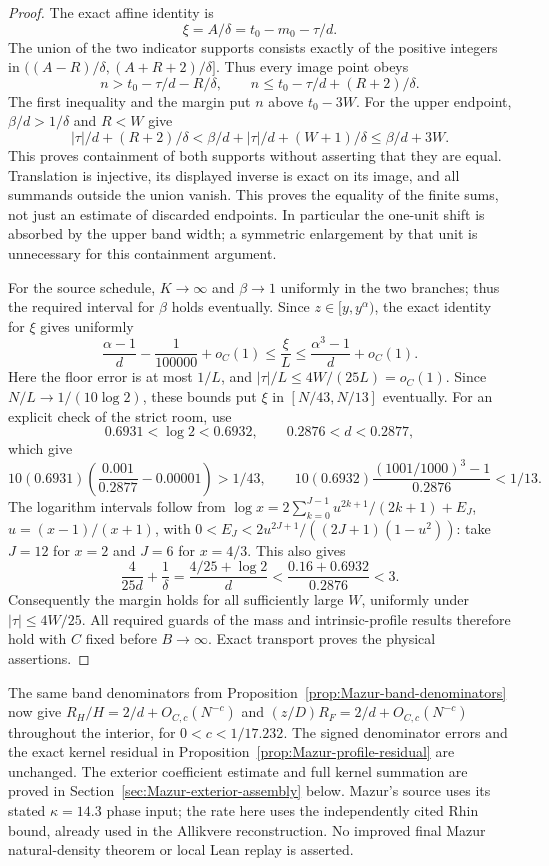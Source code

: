 \begin{proof}
The exact affine identity is
\[
 \xi=A/\delta=t_0-m_0-\tau/d.
\]
The union of the two indicator supports consists exactly of the
positive integers in
$((A-R)/\delta,(A+R+2)/\delta]$. Thus every image point obeys
\[
 n>t_0-\tau/d-R/\delta,\qquad
 n\le t_0-\tau/d+(R+2)/\delta.
\]
The first inequality and the margin put $n$ above $t_0-3W$.
For the upper endpoint, $\beta/d>1/\delta$ and $R<W$ give
\[
 |\tau|/d+(R+2)/\delta
 <\beta/d+|\tau|/d+(W+1)/\delta
 \le\beta/d+3W.
\]
This proves containment of both supports without asserting that they
are equal. Translation is injective, its displayed inverse is exact
on its image, and all summands outside the union vanish.
This proves the equality of the finite sums, not just an estimate
of discarded endpoints. In particular the one-unit shift is absorbed
by the upper band width; a symmetric enlargement by that unit is
unnecessary for this containment argument.

For the source schedule, $K\to\infty$ and $\beta\to1$ uniformly in
the two branches; thus the required interval for $\beta$ holds
eventually. Since $z\in[y,y^\alpha)$, the exact identity for $\xi$
gives uniformly
\[
 \frac{\alpha-1}{d}-\frac1{100000}+o_C(1)
 \le\frac{\xi}{L}
 \le\frac{\alpha^3-1}{d}+o_C(1).
\]
Here the floor error is at most $1/L$, and
$|\tau|/L\le4W/(25L)=o_C(1)$. Since $N/L\to1/(10\log2)$,
these bounds put $\xi$ in $[N/43,N/13]$ eventually. For an explicit
check of the strict room, use
\[
 0.6931<\log2<0.6932,\qquad
 0.2876<d<0.2877,
\]
which give
\[
 10(0.6931)\left(\frac{0.001}{0.2877}-0.00001\right)>1/43,
 \qquad
 10(0.6932)\frac{(1001/1000)^3-1}{0.2876}<1/13.
\]
The logarithm intervals follow from
$\log x=2\sum_{k=0}^{J-1}u^{2k+1}/(2k+1)+E_J$,
$u=(x-1)/(x+1)$, with
$0<E_J<2u^{2J+1}/((2J+1)(1-u^2))$:
take $J=12$ for $x=2$ and $J=6$ for $x=4/3$.
This also gives
\[
 \frac{4}{25d}+\frac1\delta
 =\frac{4/25+\log2}{d}
 <\frac{0.16+0.6932}{0.2876}<3.
\]
Consequently the margin holds for all sufficiently large $W$,
uniformly under $|\tau|\le4W/25$. All required guards of the mass
and intrinsic-profile results therefore hold with $C$ fixed before
$B\to\infty$. Exact transport proves the physical assertions.
\end{proof}

The same band denominators from
Proposition~\ref{prop:Mazur-band-denominators} now give
$R_H/H=2/d+O_{C,c}(N^{-c})$ and
$(z/D)R_F=2/d+O_{C,c}(N^{-c})$ throughout the interior,
for $0<c<1/17.232$. The signed denominator errors and the exact
kernel residual in Proposition~\ref{prop:Mazur-profile-residual}
are unchanged. The exterior coefficient estimate and full kernel
summation are proved in Section~\ref{sec:Mazur-exterior-assembly} below.
Mazur's source uses its stated $\kappa=14.3$
phase input; the rate here uses the independently cited Rhin bound,
already used in the Allikvere reconstruction. No improved final
Mazur natural-density theorem or local Lean replay is asserted.

